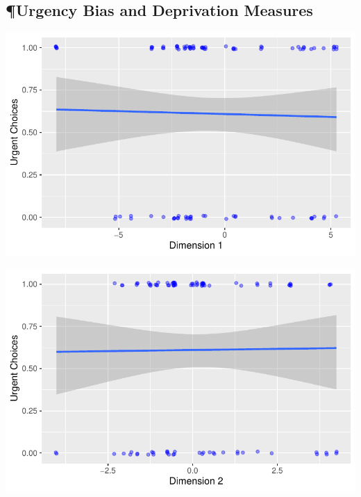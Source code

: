 \hypertarget{urgency-bias-and-deprivation-measures}{%
\subsection{¶Urgency Bias and Deprivation
Measures}\label{urgency-bias-and-deprivation-measures}}

\includegraphics{thesis-file-ppq_files/figure-latex/img-urg-pca-1.pdf}

\includegraphics{thesis-file-ppq_files/figure-latex/img-urg-pca-2.pdf}

